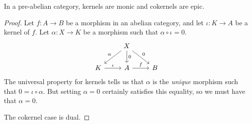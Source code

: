 \documentclass[main.tex]{subfiles}
\begin{document}
\begin{proposition}
  In a pre-abelian category, kernels are monic and cokernels are epic.
\end{proposition}
\begin{proof}
  Let $f\colon A \to B$ be a morphism in an abelian category, and let $\iota\colon K \to A$ be a kernel of $f$. Let $\alpha\colon X \to K$ be a morphism such that $\alpha \circ \iota = 0$.
  \begin{equation*}
    \begin{tikzcd}
      & X
      \arrow[dl, swap, "\alpha"]
      \arrow[d, "0"]
      \arrow[dr, "0"]
      \\
      K
      \arrow[r, "\iota"]
      & A
      \arrow[r, "f"]
      & B
    \end{tikzcd}
  \end{equation*}
  The universal property for kernels tells us that $\alpha$ is the \emph{unique} morphism such that $0 = \iota \circ \alpha$. But setting $\alpha = 0$ certainly satisfies this equality, so we must have that $\alpha = 0$.

  The cokernel case is dual.
\end{proof}
\end{document}
